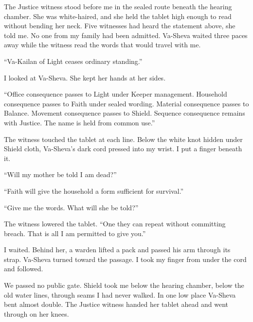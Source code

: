 
\ornament

The Justice witness stood before me in the sealed route beneath the hearing chamber. She was white-haired, and she held the tablet high enough to read without bending her neck. Five witnesses had heard the statement above, she told me. No one from my family had been admitted. Va-Sheva waited three paces away while the witness read the words that would travel with me.\par

``Va-Kailan of Light ceases ordinary standing.''\par

I looked at Va-Sheva. She kept her hands at her sides.\par

``Office consequence passes to Light under Keeper management. Household consequence passes to Faith under sealed wording. Material consequence passes to Balance. Movement consequence passes to Shield. Sequence consequence remains with Justice. The name is held from common use.''\par

The witness touched the tablet at each line. Below the white knot hidden under Shield cloth, Va-Sheva's dark cord pressed into my wrist. I put a finger beneath it.\par

``Will my mother be told I am dead?''\par

``Faith will give the household a form sufficient for survival.''\par

``Give me the words. What will she be told?''\par

The witness lowered the tablet. ``One they can repeat without committing breach. That is all I am permitted to give you.''\par

I waited. Behind her, a warden lifted a pack and passed his arm through its strap. Va-Sheva turned toward the passage. I took my finger from under the cord and followed.\par

We passed no public gate. Shield took me below the hearing chamber, below the old water lines, through seams I had never walked. In one low place Va-Sheva bent almost double. The Justice witness handed her tablet ahead and went through on her knees.\par

